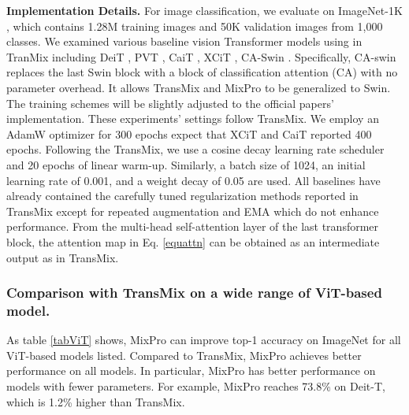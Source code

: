 \documentclass{article} \usepackage{iclr2023_conference,times}
\begin{document}
\textbf{Implementation Details.} For image classification, we evaluate on ImageNet-1K \citep{deng2009imagenet}, which contains 1.28M training images and 50K validation images from 1,000 classes. We examined various baseline vision Transformer models using in TranMix \citep{chen2021transmix} including DeiT \citep{deit}, PVT \citep{pyramidViTs}, CaiT \citep{cait}, XCiT \citep{ali2021xcit}, CA-Swin \citep{swin,chen2021transmix}. Specifically, CA-swin replaces the last Swin block \citep{swin} with a block of classification attention (CA) with no parameter overhead. It allows TransMix and MixPro to be generalized to Swin. The training schemes will be slightly adjusted to the official papers’ implementation. These experiments' settings follow TransMix\citep{chen2021transmix}. We employ an AdamW  optimizer for 300 epochs expect that XCiT \citep{ali2021xcit} and CaiT \citep{cait} reported 400 epochs. Following the TransMix, we use a cosine decay learning rate scheduler and 20 epochs of linear warm-up. Similarly, a batch size of 1024, an initial learning rate of 0.001, and a weight decay of 0.05 are used. All baselines have already contained the carefully tuned regularization methods reported in TransMix \citep{chen2021transmix} except for repeated augmentation \citep{hoffer2020augment} and EMA \citep{polyak1992acceleration} which do not enhance performance. From the multi-head self-attention layer of the last transformer block, the attention map  in Eq. \ref{equattn} can be obtained as an intermediate output as in TransMix\citep{chen2021transmix}.

\subsubsection{Comparison with TransMix on a wide range of ViT-based model.}

As table \ref{tabViT} shows, MixPro can improve top-1 accuracy on ImageNet for all ViT-based models listed. Compared to TransMix, MixPro achieves better performance on all models. In particular, MixPro has better performance on models with fewer parameters. For example, MixPro reaches 73.8\% on Deit-T, which is 1.2\% higher than TransMix.

\vspace{-10px}
\end{document}
